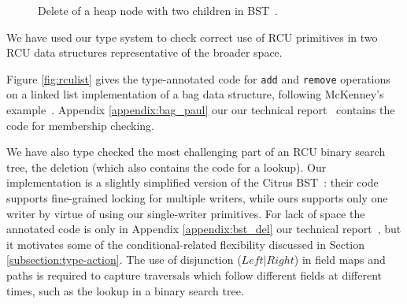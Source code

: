 \begin{figure}[!t]
\begin{subfigure}[b]{.4\linewidth}
\label{fig:del2.6}
\end{subfigure}
\caption{\textsf{Delete} of a heap node with two children in BST~\cite{Arbel:2014:CUR:2611462.2611471}.}
\label{fig:del2}
\end{figure}
We have used our type system to check correct use of RCU primitives in two RCU data structures representative of the broader space.

Figure \ref{fig:rculist} gives the type-annotated code for \lstinline|add| and \lstinline|remove| operations on a linked list implementation of a bag data structure, following McKenney's example~\cite{McKenney2015SomeEO}.
Appendix \ref{appendix:bag_paul} our our technical report~\cite{isotek} contains the code for membership checking.

We have also type checked the most challenging part of an RCU binary search tree, the deletion (which also contains the code for a lookup).
Our implementation is a slightly simplified version of the Citrus BST~\cite{Arbel:2014:CUR:2611462.2611471}: their code supports fine-grained locking for multiple writers, while ours supports only one writer by virtue of using our single-writer primitives. For lack of space the annotated code is only in Appendix \ref{appendix:bst_del} our technical report~\cite{isotek}, but it motivates some of the conditional-related flexibility discussed in Section \ref{subsection:type-action}.
The use of disjunction ($Left|Right$) in field maps and paths is required to capture traversals which follow different fields at different times, such as the lookup in a binary search tree.

